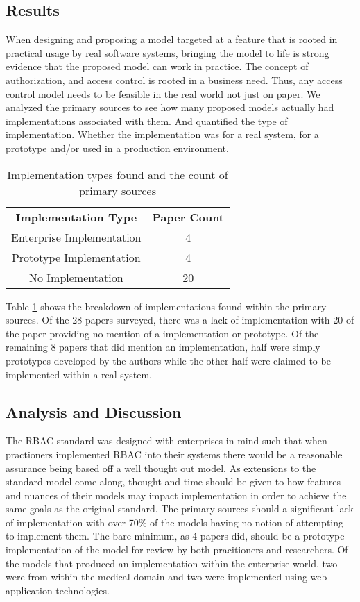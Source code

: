 \subsection{Results}

When designing and proposing a model targeted at a feature that is rooted in practical
usage by real software systems, bringing the model to life is strong evidence that the
proposed model can work in practice.  The concept of authorization, and access control
is rooted in a business need.  Thus, any access control model needs to be feasible
in the real world not just on paper.  We analyzed the primary sources to see how many
proposed models actually had implementations associated with them.  And quantified the
type of implementation.  Whether the implementation was for a real system, for a prototype
and/or used in a production environment.

\begin{table}
\centering
\caption{Implementation types found and the count of primary sources}
\begin{tabular}{ | c | c | }
\cline{1-2}

\textbf{Implementation Type} & \textbf{Paper Count} \\ \cline{1-2}
Enterprise Implementation & 4 \\ \cline{1-2}
Prototype Implementation & 4 \\ \cline{1-2}
No Implementation & 20 \\

\cline{1-2}
\end{tabular}
\label{tab:implementations}
\end{table}

Table \ref{tab:implementations} shows the breakdown of implementations found within the primary sources.
Of the 28 papers surveyed, there was a lack of implementation with 20 of the paper providing no
mention of a implementation or prototype.  Of the remaining 8 papers that did mention an implementation, half 
were simply prototypes developed by the authors while the other half were claimed to be implemented within a real
system.

\subsection{Analysis and Discussion}

The RBAC standard was designed with enterprises in mind such that when practioners implemented RBAC into their systems
there would be a reasonable assurance being based off a well thought out model.  As extensions to the standard model
come along, thought and time should be given to how features and nuances of their models may impact implementation
in order to achieve the same goals as the original standard.  The primary sources should a significant lack of implementation
with over 70\% of the models having no notion of attempting to implement them.  The bare minimum, as 4 papers did, should be
a prototype implementation of the model for review by both pracitioners and researchers. Of the models that produced an 
implementation within the enterprise world, two were from within the medical domain and two were implemented using web application technologies.  

